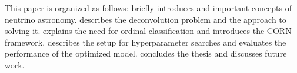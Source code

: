 This paper is organized as follows:
 briefly introduces \icecube{} and important concepts of neutrino astronomy.
 describes the deconvolution problem and the \dsea{} approach to solving it.
 explains the need for ordinal classification and introduces the \ac{CORN} framework.
 describes the setup for hyperparameter searches and evaluates the performance of the optimized model.
 concludes the thesis and discusses future work.
